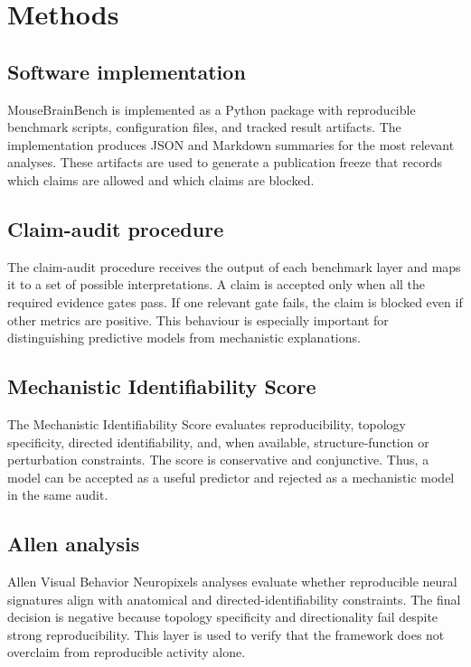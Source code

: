 \section{Methods}

\subsection{Software implementation}

MouseBrainBench is implemented as a Python package with reproducible benchmark
scripts, configuration files, and tracked result artifacts. The implementation
produces JSON and Markdown summaries for the most relevant analyses. These
artifacts are used to generate a publication freeze that records which claims
are allowed and which claims are blocked.

\subsection{Claim-audit procedure}

The claim-audit procedure receives the output of each benchmark layer and maps
it to a set of possible interpretations. A claim is accepted only when all the
required evidence gates pass. If one relevant gate fails, the claim is blocked
even if other metrics are positive. This behaviour is especially important for
distinguishing predictive models from mechanistic explanations.

\subsection{Mechanistic Identifiability Score}

The Mechanistic Identifiability Score evaluates reproducibility, topology
specificity, directed identifiability, and, when available, structure-function or
perturbation constraints. The score is conservative and conjunctive. Thus, a
model can be accepted as a useful predictor and rejected as a mechanistic model
in the same audit.

\subsection{Allen analysis}

Allen Visual Behavior Neuropixels analyses evaluate whether reproducible neural
signatures align with anatomical and directed-identifiability constraints. The
final decision is negative because topology specificity and directionality fail
despite strong reproducibility. This layer is used to verify that the framework
does not overclaim from reproducible activity alone.

